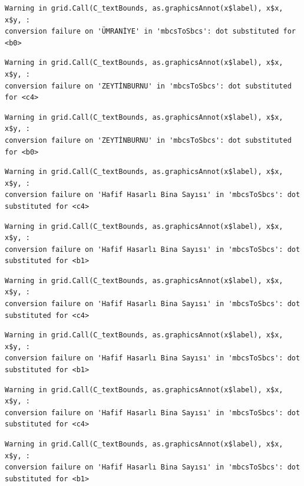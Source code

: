 \documentclass[
  11pt,
  a4paper,
  DIV=11,
  numbers=noendperiod]{scrartcl}
\begin{document}
\begin{verbatim}
Warning in grid.Call(C_textBounds, as.graphicsAnnot(x$label), x$x, x$y, :
conversion failure on 'ÜMRANİYE' in 'mbcsToSbcs': dot substituted for <b0>
\end{verbatim}

\begin{verbatim}
Warning in grid.Call(C_textBounds, as.graphicsAnnot(x$label), x$x, x$y, :
conversion failure on 'ZEYTİNBURNU' in 'mbcsToSbcs': dot substituted for <c4>
\end{verbatim}

\begin{verbatim}
Warning in grid.Call(C_textBounds, as.graphicsAnnot(x$label), x$x, x$y, :
conversion failure on 'ZEYTİNBURNU' in 'mbcsToSbcs': dot substituted for <b0>
\end{verbatim}

\begin{verbatim}
Warning in grid.Call(C_textBounds, as.graphicsAnnot(x$label), x$x, x$y, :
conversion failure on 'Hafif Hasarlı Bina Sayısı' in 'mbcsToSbcs': dot
substituted for <c4>
\end{verbatim}

\begin{verbatim}
Warning in grid.Call(C_textBounds, as.graphicsAnnot(x$label), x$x, x$y, :
conversion failure on 'Hafif Hasarlı Bina Sayısı' in 'mbcsToSbcs': dot
substituted for <b1>
\end{verbatim}

\begin{verbatim}
Warning in grid.Call(C_textBounds, as.graphicsAnnot(x$label), x$x, x$y, :
conversion failure on 'Hafif Hasarlı Bina Sayısı' in 'mbcsToSbcs': dot
substituted for <c4>
\end{verbatim}

\begin{verbatim}
Warning in grid.Call(C_textBounds, as.graphicsAnnot(x$label), x$x, x$y, :
conversion failure on 'Hafif Hasarlı Bina Sayısı' in 'mbcsToSbcs': dot
substituted for <b1>
\end{verbatim}

\begin{verbatim}
Warning in grid.Call(C_textBounds, as.graphicsAnnot(x$label), x$x, x$y, :
conversion failure on 'Hafif Hasarlı Bina Sayısı' in 'mbcsToSbcs': dot
substituted for <c4>
\end{verbatim}

\begin{verbatim}
Warning in grid.Call(C_textBounds, as.graphicsAnnot(x$label), x$x, x$y, :
conversion failure on 'Hafif Hasarlı Bina Sayısı' in 'mbcsToSbcs': dot
substituted for <b1>
\end{verbatim}
\end{document}
